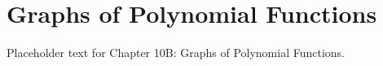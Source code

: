 \section{Graphs of Polynomial Functions}
Placeholder text for Chapter 10B: Graphs of Polynomial Functions.

